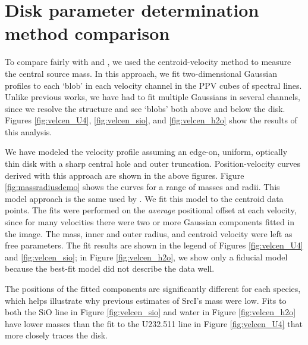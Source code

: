 \documentclass[twocolumn]{aastex62}
\newcommand{\sourcei}{SrcI\xspace}
\begin{document}
\section{Disk parameter determination method comparison}
\label{appendix:centroids}
To compare fairly with \citet{Hirota2014a} and \citet{Plambeck2016a}, we  used
the centroid-velocity method to measure the central source mass.  In this
approach, we fit two-dimensional Gaussian profiles to each `blob' in each
velocity channel in the PPV cubes of spectral lines.  Unlike previous works, we
have had to fit multiple Gaussians in several channels, since we resolve the
structure and see `blobs' both above and below the disk.  Figures
\ref{fig:velcen_U4}, \ref{fig:velcen_sio}, and \ref{fig:velcen_h2o} show the
results of this analysis.



We have modeled the velocity profile assuming an edge-on, uniform, optically
thin disk with a sharp central hole and outer truncation.  Position-velocity
curves derived with this approach are shown in the above figures. Figure
\ref{fig:massradiusdemo} shows the curves for a range of masses and radii.
This model approach is the same used by \citet{Plambeck2016a}.  We fit this
model to the centroid data points.  The fits were performed on the
\emph{average} positional offset at each velocity, since for many velocities
there were two or more Gaussian components fitted in the image.  The mass,
inner and outer radius, and centroid velocity were left as free parameters.
The fit results are shown in the legend of Figures 
\ref{fig:velcen_U4} and \ref{fig:velcen_sio}; in Figure \ref{fig:velcen_h2o},
we show only a fiducial model because the best-fit model did not describe
the data well.

The positions of the fitted components are significantly different for each
species, which helps illustrate why previous estimates of \sourcei's mass were
low.  Fits to both the SiO line in Figure \ref{fig:velcen_sio} and water in
Figure \ref{fig:velcen_h2o} have lower masses than the fit to the U232.511 line
in Figure \ref{fig:velcen_U4} that more closely traces the disk.
\end{document}
